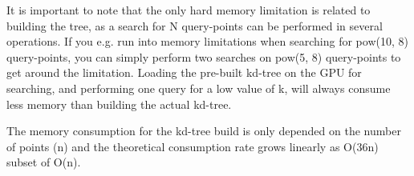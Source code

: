 

It is important to note that the only hard memory limitation is related to building the tree, as a search for N query-points can be performed in several operations. If you e.g. run into memory limitations when searching for pow(10, 8) query-points, you can simply perform two searches on pow(5, 8) query-points to get around the limitation. Loading the pre-built kd-tree on the GPU for searching, and performing one query for a low value of k, will always consume less memory than building the actual kd-tree.


The memory consumption for the kd-tree build is only depended on the number of points (n) and the theoretical consumption rate grows linearly as O(36n) subset of O(n).






